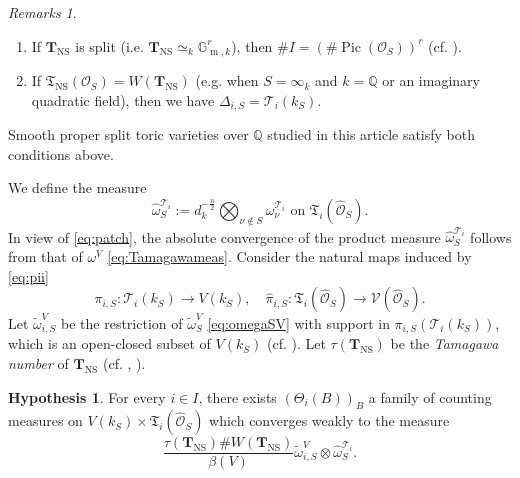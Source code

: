 \documentclass[11pt,letterpaper]{amsart}
\newcommand{\BQ}{{\mathbb {Q}}}
\newcommand{\CO}{{\mathcal {O}}}
\newcommand{\CV}{{\mathcal {V}}}
\newcommand{\CTUT}{\mathcal{T}}
\newcommand{\FTUT}{\mathfrak{T}}
\newcommand{\CTNS}{\mathbf{T}_{\operatorname{NS}}}
\newcommand{\FTNS}{\mathfrak{T}_{\operatorname{NS}}}
\theoremstyle{plain}
\numberwithin{equation}{section}
\theoremstyle{definition}
\newtheorem{hypothesis1}[theorem]{Hypothesis}
\theoremstyle{remark}
\newtheorem{remarks}[theorem]{Remarks}
\begin{document}
\begin{remarks}
	\hfill
	\begin{enumerate}
		\item 	If $\CTNS$ is split (i.e. $\CTNS\simeq_k \mathbb{G}_{\operatorname{m},k}^{r}$), then $\# I =(\#\operatorname{Pic}(\CO_S))^r$ (cf. \cite[Theorem 2.7]{Frei-Pieropan}).
		\item  If $\FTNS(\CO_S)=W(\CTNS)$ (e.g. when $S=\infty_k$ and $k=\BQ$ or an imaginary quadratic field), then we have $\varDelta_{i,S}=\CTUT_i(k_S)$.
	\end{enumerate}
	Smooth proper split toric varieties over $\BQ$ studied in this article satisfy both conditions above. 
\end{remarks}

We define the measure
\begin{equation}\label{eq:measS}
\widehat{\omega}_S^{\CTUT_i}:=d_k^{-\frac{n}{2}}\bigotimes_{\nu\notin S}\omega_\nu^{\CTUT_i}\text{ on } \FTUT_i(\widehat{\CO}_S).
\end{equation} In view of \eqref{eq:patch}, the absolute convergence of the product measure $\widehat{\omega}_S^{\CTUT_i}$ follows from that of $\omega^V$ \eqref{eq:Tamagawameas}.
Consider the natural maps induced by \eqref{eq:pii} $$\pi_{i,S}:\CTUT_i(k_S)\to V(k_S),\quad \widehat{\pi}_{i,S}:\FTUT_i(\widehat{\CO}_S)\to \CV(\widehat{\CO}_S).$$ Let $\widetilde{\omega}_{i,S}^V$ be the restriction of $\widetilde{\omega}_S^V$ \eqref{eq:omegaSV} with support in $\pi_{i,S}\left(\CTUT_i(k_S)\right)$, which is an open-closed subset of $V(k_S)$ (cf. \cite[Proposition 5.20]{Salberger}).  Let $\tau(\CTNS)$ be the \emph{Tamagawa number} of $\CTNS$ (cf. \cite[D\'efinition 3.1.5]{Peyre2}, \cite[p. 251]{PeyreBeyond}).
\begin{hypothesis1}\label{hyp:Tamamagauniv}
	For every $i\in I$, there exists $(\Theta_i(B))_B$ a family of counting measures on $V(k_S)\times\FTUT_i(\widehat{\CO}_S)$ which converges weakly to  the measure \begin{equation}\label{eq:Tamagamameaunivtor}
		\frac{\tau(\CTNS)\# W(\CTNS)}{\beta(V)}\widetilde{\omega}_{i,S}^V\otimes \widehat{\omega}_S^{\CTUT_i}.
	\end{equation}
\end{hypothesis1}
\end{document}
